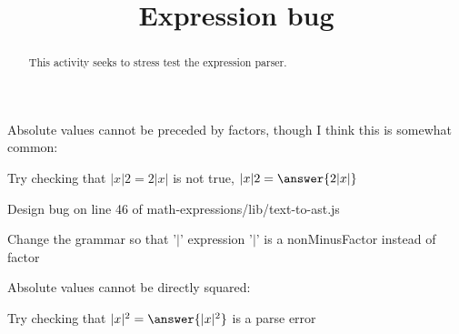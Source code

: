 \documentclass[handout]{ximera}
\title{Expression bug}
\begin{document}
\begin{abstract} This activity seeks to stress test the expression parser.
\end{abstract}


\maketitle

\begin{problem}
Absolute values cannot be preceded by factors, though I think this is somewhat common:

Try checking that $ |x|2 = 2|x|$ is not true, $ |x|2 = \answer{2|x|}$

Design bug on line 46 of math-expressions/lib/text-to-ast.js

Change the grammar so that '$|$' expression '$|$' is a nonMinusFactor instead of factor
\end{problem}

\begin{problem}
Absolute values cannot be directly squared:

Try checking that $|x|^2 = \answer{|x|^2}$ is a parse error
\end{problem}
\end{document}
